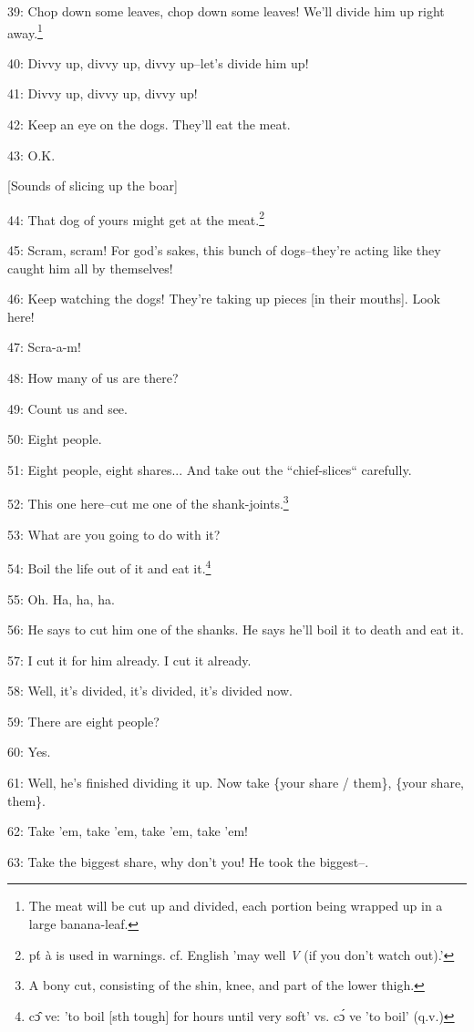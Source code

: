 39: Chop down some leaves, chop down some leaves! We'll divide him up right away.\footnote{The meat will be cut up and divided, each portion being wrapped up in a large banana-leaf.}

40: Divvy up, divvy up, divvy up--let's divide him up!

41: Divvy up, divvy up, divvy up!

42: Keep an eye on the dogs. They'll eat the meat.

43: O.K.

[Sounds of slicing up the boar]

44: That dog of yours might get at the meat.\footnote{pt́ à is used in warnings. cf. English 'may well \emph{V} (if you don't watch out).'}

45: Scram, scram! For god's sakes, this bunch of dogs--they're acting like they
caught him all by themselves!

46: Keep watching the dogs! They're taking up pieces [in their mouths]. Look here!

47: Scra-a-m!

48: How many of us are there?

49: Count us and see.

50: Eight people.

51: Eight people, eight shares... And take out the ``chief-slices``
carefully.

52: This one here--cut me one of the shank-joints.\footnote{A bony cut, consisting of the shin, knee, and part of the lower thigh.}

53: What are you going to do with it?

54: Boil the life out of it and eat it.\footnote{cɔ̂ ve: 'to boil [sth tough] for hours until very soft' vs. cɔ́ ve 'to boil' (q.v.)}

55: Oh. Ha, ha, ha.

56: He says to cut him one of the shanks. He says he'll boil it to death and eat
it.

57: I cut it for him already. I cut it already.

58: Well, it's divided, it's divided, it's divided now.

59: There are eight people?

60: Yes.

61: Well, he's finished dividing it up. Now take \{your share / them\}, \{your
share, them\}.

62: Take 'em, take 'em, take 'em, take 'em!

63: Take the biggest share, why don't you! He took the biggest--.

